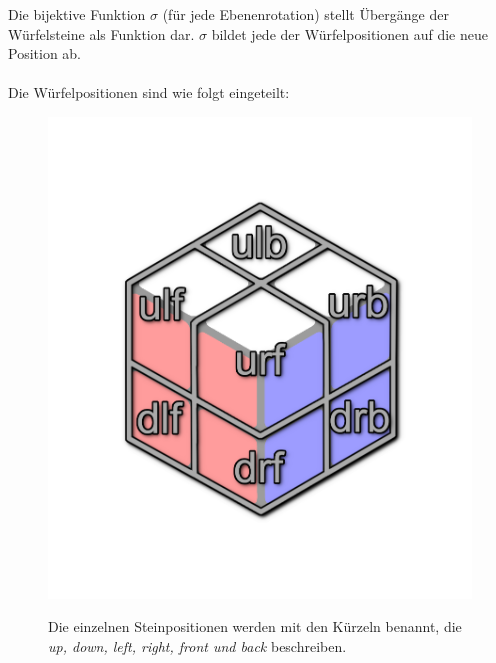 \documentclass[12pt,a4paper, usenames, dvipsnames]{article}
\begin{document}
Die bijektive Funktion $\sigma$ (für jede Ebenenrotation) stellt Übergänge der Würfelsteine als Funktion dar. $\sigma$ bildet jede der Würfelpositionen auf die neue Position ab. \\
\\
Die Würfelpositionen sind wie folgt eingeteilt: \\
\begin{figure}[H]
\centering
\includegraphics[scale=0.15]{caged_positions.png} \\
\caption[Namen der Steinpositionen im Würfel]{Die einzelnen Steinpositionen werden mit den Kürzeln benannt, die \textit{up, down, left, right, front und back} beschreiben.}
\end{figure}
\end{document}
